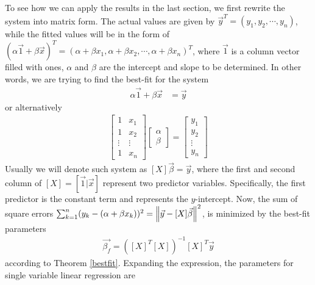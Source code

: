 To see how we can apply the results in the last section, we first rewrite the system into matrix form. The actual values are given by $\vec{y}^T = (y_1, y_2, \cdots, y_n)$, while the fitted values will be in the form of $(\alpha\vec{1} + \beta \vec{x})^T = (\alpha + \beta x_1, \alpha + \beta x_2, \cdots, \alpha + \beta x_n)^T$, where $\vec{1}$ is a column vector filled with ones, $\alpha$ and $\beta$ are the intercept and slope to be determined.
In other words, we are trying to find the best-fit for the system
\begin{align*}
\alpha\vec{1} + \beta \vec{x} &= \vec{y}
\end{align*}
or alternatively
\begin{align*}
\begin{bmatrix}
1 & x_1 \\
1 & x_2 \\
\vdots & \vdots \\
1 & x_n
\end{bmatrix}
\begin{bmatrix}
\alpha \\
\beta
\end{bmatrix}
=
\begin{bmatrix}
y_1 \\
y_2 \\
\vdots \\
y_n
\end{bmatrix}
\end{align*}
Usually we will denote such system as $[X]\vec{\beta} = \vec{y}$, where the first and second column of $[X] = [\vec{1}|\vec{x}]$ represent two predictor variables. Specifically, the first predictor is the constant term and represents the $y$-intercept. Now, the sum of square errors $\sum_{k=1}^n (y_k - (\alpha + \beta x_k))^2 = \norm{\vec{y} - [X]\vec{\beta}}^2$, is minimized by the best-fit parameters
\begin{align*}
\vec{\beta_f} = ([X]^T[X])^{-1}[X]^T \vec{y}
\end{align*}
according to Theorem \ref{bestfit}. Expanding the expression, the parameters for single variable linear regression are
